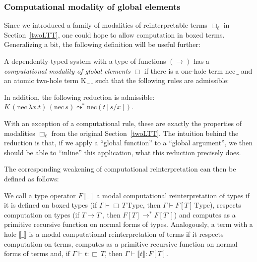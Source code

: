 \subsubsection{
    Computational modality of global elements}
\label{global-elements}

Since we introduced a family of modalities of
reinterpretable terms $\Box_\ell$ in
Section~\ref{twoLTT}, one could hope to allow computation in
boxed terms. Generalizing a bit, the following
definition will be useful further:

\begin{definition}
    A dependently-typed system with a type of functions
    $(\to)$ has a \textit{computational modality of
    global elements} $\Box$ if there is a one-hole term
    $\mathrm{nec}\,\_$ and an atomic two-hole term
    $\mathrm{K}\,\_\,\_$ such that the following rules
    are admissible:
    In addition, the following reduction is
    admissible: $K\,(\mathrm{nec}\,\lambda x.t)\,
    (\mathrm{nec}\,s)\leadsto^*
    \mathrm{nec}(t[s/x])$.
\end{definition}

With an exception of a computational rule, these are
exactly the properties of modalities $\Box_\ell$ from
the original Section~\ref{twoLTT}. The intuition behind
the reduction is that, if we apply a ``global function''
to a ``global argument'', we then should be able to
``inline'' this application, what this reduction
precisely does.

The corresponding weakening of computational
reinterpretation can then be defined as follows:

\begin{definition}
    We call a type operator $F[\_]$ a modal
    computational reinterpretation of types if it is
    defined on boxed types (if
    $\Gamma\vdash\Box\,T\,\mathrm{Type}$, then
    $\Gamma\vdash F[T]\,\mathrm{Type}$), respects
    computation on types (if $T\to T'$, then
    $F[T]\to^* F[T']$) and computes as a primitive
    recursive function on normal forms of types.
    Analogously, a term with a hole
    $\llbracket\_\rrbracket$ is a modal computational
    reinterpretation of terms if it respects computation
    on terms, computes as a primitive recursive
    function on normal forms of terms and, if
    $\Gamma\vdash t:\Box\,T$, then
    $\Gamma\vdash\llbracket t\rrbracket:F[T]$.
\end{definition}

